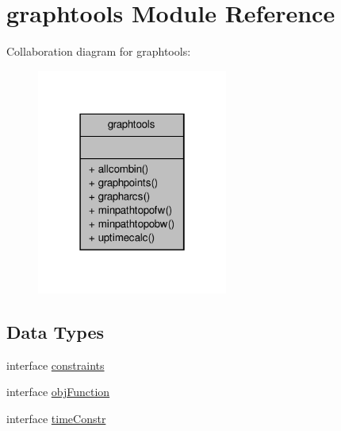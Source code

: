 \hypertarget{classgraphtools}{\section{graphtools Module Reference}
\label{classgraphtools}
}


Collaboration diagram for graphtools\-:\nopagebreak
\begin{figure}[H]
\begin{center}
\leavevmode
\includegraphics[width=178pt]{classgraphtools__coll__graph}
\end{center}
\end{figure}
\subsection*{Data Types}
\begin{DoxyCompactItemize}
\item 
interface \hyperlink{interfacegraphtools_1_1constraints}{constraints}
\item 
interface \hyperlink{interfacegraphtools_1_1obj_function}{obj\-Function}
\item 
interface \hyperlink{interfacegraphtools_1_1time_constr}{time\-Constr}
\end{DoxyCompactItemize}
